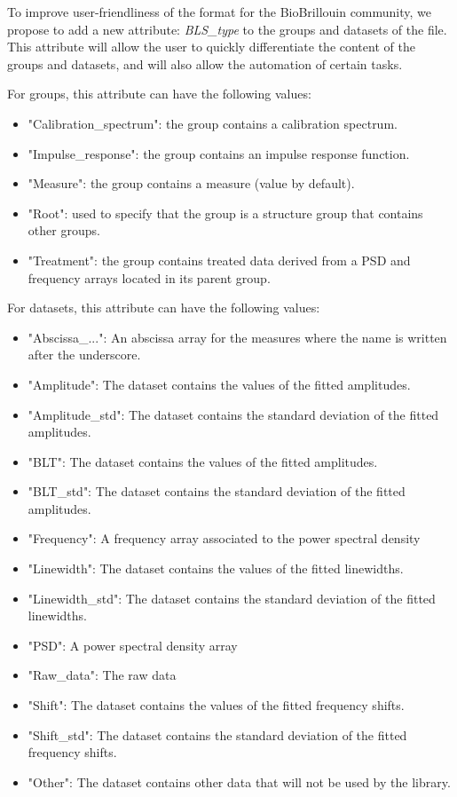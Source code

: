 To improve user-friendliness of the format for the BioBrillouin community, we propose to add a new attribute: \textit{BLS\_type} to the groups and datasets of the file. This attribute will allow the user to quickly differentiate the content of the groups and datasets, and will also allow the automation of certain tasks.

For groups, this attribute can have the following values:
\begin{itemize}
    \item "Calibration\_spectrum": the group contains a calibration spectrum.
    \item "Impulse\_response": the group contains an impulse response function.
    \item "Measure": the group contains a measure (value by default).
    \item "Root": used to specify that the group is a structure group that contains other groups.
    \item "Treatment": the group contains treated data derived from a PSD and frequency arrays located in its parent group.
\end{itemize}

For datasets, this attribute can have the following values:
\begin{itemize}
    \item "Abscissa\_...": An abscissa array for the measures where the name is written after the underscore.
    \item "Amplitude": The dataset contains the values of the fitted amplitudes.
    \item "Amplitude\_std": The dataset contains the standard deviation of the fitted amplitudes.
    \item "BLT": The dataset contains the values of the fitted amplitudes.
    \item "BLT\_std": The dataset contains the standard deviation of the fitted amplitudes.
    \item "Frequency": A frequency array associated to the power spectral density
    \item "Linewidth": The dataset contains the values of the fitted linewidths.
    \item "Linewidth\_std": The dataset contains the standard deviation of the fitted linewidths. 
    \item "PSD": A power spectral density array
    \item "Raw\_data": The raw data
    \item "Shift": The dataset contains the values of the fitted frequency shifts.
    \item "Shift\_std": The dataset contains the standard deviation of the fitted frequency shifts.
    \item "Other": The dataset contains other data that will not be used by the library.
\end{itemize}


